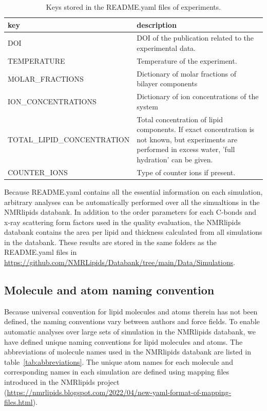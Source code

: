 \documentclass[fleqn,10pt]{wlscirep}
\begin{document}
\begin{table}[]
    \centering
    \begin{tabular}{  p{5.0cm}  p{10.0cm}}
    \toprule
    key & description \\
    \midrule
    DOI & DOI of the publication related to the experimental data. \\
    TEMPERATURE & Temperature of the experiment. \\
    MOLAR\_FRACTIONS & Dictionary of molar fractions of bilayer components \\
    ION\_CONCENTRATIONS & Dictionary of ion concentrations of the system \\%
    TOTAL\_LIPID\_CONCENTRATION & Total concentration of lipid components. If exact concentration is not known, but experiments are performed in excess water, 'full hydration' can be given. \\
    COUNTER\_IONS & Type of counter ions if present.
\end{tabular}
    \caption{Keys stored in the README.yaml files of experiments.}
    \label{tab:READMEkeysEXP}
\end{table}

Because README.yaml contains all the essential information on each simulation, arbitrary analyses can be automatically performed over all the simualtions in the NMRlipids databank. In addition to the order parameters for each C-bonds and x-ray scattering form factors used in the quality evaluation, the NMRlipids databank contains the area per lipid and thickness calculated from all simulations in the databank. These results are stored in the same folders as the README.yaml files in \url{https://github.com/NMRLipids/Databank/tree/main/Data/Simulations}.

\subsection{Molecule and atom naming convention} \label{naming}

Because universal convention for lipid molecules and atoms therein has not been defined, the naming conventions vary between authors and force fields. To enable automatic analyses over large sets of simulation in the NMRlipids databank, we have defined unique naming conventions for lipid molecules and atoms. The abbreviations of molecule names used in the NMRlipids databank are listed in table~\ref{tab:abbreviations}. The unique atom names for each molecule and corresponding names in each simulation are defined using mapping files introduced in the NMRlipids project (\url{https://nmrlipids.blogspot.com/2022/04/new-yaml-format-of-mapping-files.html}). 
\end{document}
